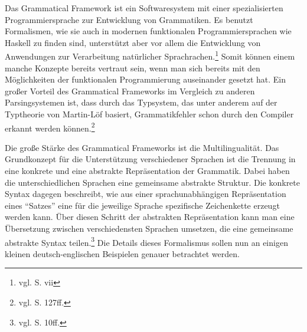 Das Grammatical Framework ist ein Softwaresystem mit einer spezialisierten Programmiersprache zur Entwicklung von Grammatiken. Es benutzt Formalismen, wie sie auch in modernen funktionalen Programmiersprachen wie Haskell zu finden sind, unterstützt aber vor allem die Entwicklung von Anwendungen zur Verarbeitung natürlicher Sprachrachen.\footnote{vgl. \cite{RANTA2011} S. vii} Somit können einem manche Konzepte bereits vertraut sein, wenn man sich bereits mit den Möglichkeiten der funktionalen Programmierung auseinander gesetzt hat. Ein großer Vorteil des Grammatical Frameworks im Vergleich zu anderen Parsingsystemen ist, dass durch das Typsystem, das unter anderem auf der Typtheorie von Martin-Löf basiert, Grammatikfehler schon durch den Compiler erkannt werden können.\footnote{vgl. \cite{RANTA2011} S. 127ff.} \par
Die große Stärke des Grammatical Frameworks ist die Multilingualität. Das Grundkonzept für die Unterstützung verschiedener Sprachen ist die Trennung in eine konkrete und eine abstrakte Repräsentation der Grammatik. Dabei haben die unterschiedlichen Sprachen eine gemeinsame abstrakte Struktur. Die konkrete Syntax dagegen beschreibt, wie aus einer sprachunabhängigen Repräsentation eines ``Satzes'' eine für die jeweilige Sprache spezifische Zeichenkette erzeugt werden kann. Über diesen Schritt der abstrakten Repräsentation kann man eine Übersetzung zwischen verschiedensten Sprachen umsetzen, die eine gemeinsame abstrakte Syntax teilen.\footnote{vgl. \cite{RANTA2011} S. 10ff.} Die Details dieses Formalismus sollen nun an einigen kleinen deutsch-englischen Beispielen genauer betrachtet werden.
\pagebreak
